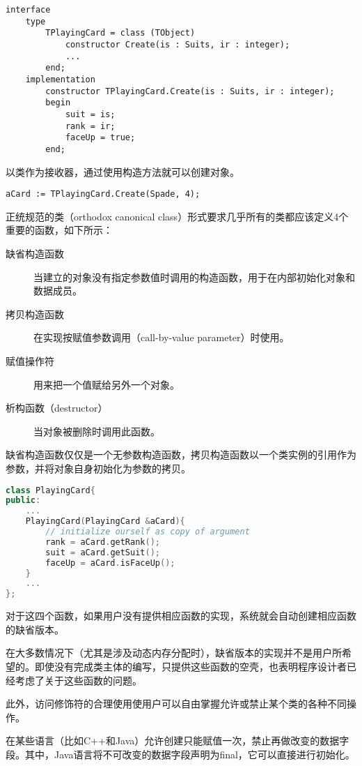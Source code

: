 \begin{lstlisting}[language=Delphi]
interface
	type
		TPlayingCard = class (TObject)
			constructor Create(is : Suits, ir : integer);
			...
		end;
	implementation
		constructor TPlayingCard.Create(is : Suits, ir : integer);
		begin
			suit = is;
			rank = ir;
			faceUp = true;
		end;
\end{lstlisting}

以类作为接收器，通过使用构造方法就可以创建对象。

\begin{lstlisting}[language=Delphi]
aCard := TPlayingCard.Create(Spade, 4);
\end{lstlisting}


正统规范的类（orthodox canonical class）形式要求几乎所有的类都应该定义4个重要的函数，如下所示：

\begin{description}
\item[缺省构造函数] 当建立的对象没有指定参数值时调用的构造函数，用于在内部初始化对象和数据成员。
\item[拷贝构造函数] 在实现按赋值参数调用（call-by-value parameter）时使用。
\item[赋值操作符] 用来把一个值赋给另外一个对象。
\item[析构函数（destructor）] 当对象被删除时调用此函数。
\end{description}

缺省构造函数仅仅是一个无参数构造函数，拷贝构造函数以一个类实例的引用作为参数，并将对象自身初始化为参数的拷贝。



\begin{lstlisting}[language=C++]
class PlayingCard{
public:
	...
	PlayingCard(PlayingCard &aCard){
		// initialize ourself as copy of argument
		rank = aCard.getRank();
		suit = aCard.getSuit();
		faceUp = aCard.isFaceUp();
	}
	...
};
\end{lstlisting}


对于这四个函数，如果用户没有提供相应函数的实现，系统就会自动创建相应函数的缺省版本。

在大多数情况下（尤其是涉及动态内存分配时），缺省版本的实现并不是用户所希望的。即使没有完成类主体的编写，只提供这些函数的空壳，也表明程序设计者已经考虑了关于这些函数的问题。

此外，访问修饰符的合理使用使用户可以自由掌握允许或禁止某个类的各种不同操作。

在某些语言（比如C++和Java）允许创建只能赋值一次，禁止再做改变的数据字段。其中，Java语言将不可改变的数据字段声明为final，它可以直接进行初始化。




